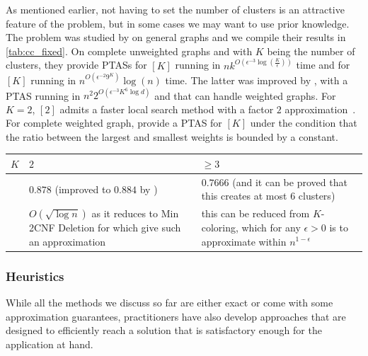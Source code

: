 \begin{aside}
As mentioned earlier, not having to set the number of clusters is an
attractive feature of the \pcc{} problem, but in some cases we may want to use prior knowledge.  The
problem was studied by \textcite{Giotis2006} on general graphs and we compile their results in
\autoref{tab:cc_fixed}. On complete unweighted graphs and with $K$ being the number of clusters, they
provide PTASs for \maxa{}$[K]$ running in $nk^{O(\epsilon^{-3}\log(\frac{K}{\epsilon}))}$ time and for
\mind{}$[K]$ running in $n^{O\left(\epsilon^{-2} 9^K\right)}\log(n)$ time. The latter was improved by
\textcite{LinearMinPTAS09}, with a PTAS running in $n^2 2^{O\left(\epsilon^{-3}K^6\log d\right)}$
and that can handle weighted graphs. For $K=2$, \mind$[2]$ admits a faster local search method with a
factor $2$ approximation~\autocite{Coleman2008}.
For complete weighted graph, \textcite{WeightedMaxAPTAS08} provide a PTAS for
\maxa{}$[K]$ under the condition that the ratio between the largest and smallest weights is bounded by a
constant.
\begin{center}
   \captionsetup{font=small}
   \begin{tabulary}{177mm}{lLL}
      \toprule
      $K$	 & $2$ & $\geq 3$ \\
      \midrule
      \maxa{} & $0.878$ (improved to $0.884$ by \autocite{Mitra2009}) & $0.7666$
      \autocite{Swamy2004} (and it can be proved that this creates at most $6$ clusters) \\
      \mind{} & $O(\sqrt{\log n})$ as it reduces to Min 2CNF Deletion for which \textcite{min2CNF05}
      give such an approximation &
      this can be reduced from $K$-coloring, which for any $\epsilon > 0$ is \NPc{} to approximate
      within $n^{1-\epsilon}$ \autocite{InnaproxChroma07} \\
      \bottomrule
   \end{tabulary}
\end{center}
\end{aside}


\subsubsection{Heuristics}
\label{ssub:cc_heuristics}

While all the methods we discuss so far
are either exact or come with some approximation guarantees, practitioners have also develop
approaches that are designed to efficiently reach a solution that is satisfactory enough for the
application at hand.


